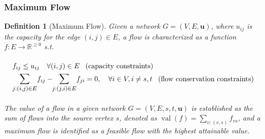 \documentclass{article} %
\theoremstyle{bfnote}
\newtheorem{definition}[theorem]{Definition}
\begin{document}
\subsubsection{Maximum Flow}
\begin{definition}[Maximum Flow]
	Given a network $G=(V, E, \bm{u})$, where $u_{i j}$ is the capacity for the edge $(i,j)\in E$, a flow is characterized as a function \( f: E \rightarrow \mathbb{R}^{\geq 0} \) s.t.
	
	\begin{equation}
		\arraycolsep=3pt
		\def\arraystretch{1.5}
		\begin{array}{ll}
			f_{i j} \leq u_{i j} \quad \forall(i, j) \in E \hspace{8pt} \text{(capacity constraints)} \\
			\vspace{4pt}
			\mathlarger{\mathlarger{\sum\limits_{j:(i, j) \in E}}} f_{i j} - \hspace{-3pt} \mathlarger{\mathlarger{\sum\limits_{j:(j, i) \in E}}} f_{j i} = 0, \quad \forall i \in V, i \neq s, t \hspace{8pt} \text{(flow conservation constraints)}
		\end{array}
		\label{eq:1}
	\end{equation}
	
	The value of a flow in a given network \( G = (V, E, s, t, \bm{u}) \) is established as the sum of flows into the source vertex \( s \), denoted as \( \operatorname{val}(f) = \sum_{v:(v, s)} f_{vs} \), and a maximum flow is identified as a feasible flow with the highest attainable value.
\end{definition}




\end{document}
